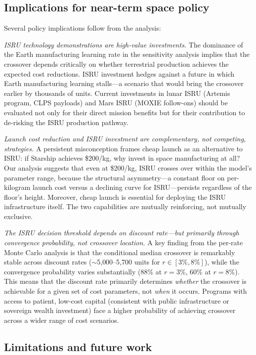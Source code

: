 \documentclass[preprint,12pt]{elsarticle}
\begin{document}
\subsection{Implications for near-term space policy}

Several policy implications follow from the analysis:

\emph{ISRU technology demonstrations are high-value investments.} The dominance of the Earth manufacturing learning rate in the sensitivity analysis implies that the crossover depends critically on whether terrestrial production achieves the expected cost reductions. ISRU investment hedges against a future in which Earth manufacturing learning stalls---a scenario that would bring the crossover earlier by thousands of units. Current investments in lunar ISRU (Artemis program, CLPS payloads) and Mars ISRU (MOXIE follow-ons) should be evaluated not only for their direct mission benefits but for their contribution to de-risking the ISRU production pathway.

\emph{Launch cost reduction and ISRU investment are complementary, not competing, strategies.} A persistent misconception frames cheap launch as an alternative to ISRU: if Starship achieves \$200/kg, why invest in space manufacturing at all? Our analysis suggests that even at \$200/kg, ISRU crosses over within the model's parameter range, because the structural asymmetry---a constant floor on per-kilogram launch cost versus a declining curve for ISRU---persists regardless of the floor's height. Moreover, cheap launch is essential for deploying the ISRU infrastructure itself. The two capabilities are mutually reinforcing, not mutually exclusive.

\emph{The ISRU decision threshold depends on discount rate---but primarily through convergence probability, not crossover location.} A key finding from the per-rate Monte Carlo analysis is that the conditional median crossover is remarkably stable across discount rates ($\sim$5{,}000--5{,}700 units for $r \in [3\%, 8\%]$), while the convergence probability varies substantially (88\% at $r = 3\%$, 60\% at $r = 8\%$). This means that the discount rate primarily determines \emph{whether} the crossover is achievable for a given set of cost parameters, not \emph{when} it occurs. Programs with access to patient, low-cost capital (consistent with public infrastructure or sovereign wealth investment) face a higher probability of achieving crossover across a wider range of cost scenarios.

\subsection{Limitations and future work}
\end{document}
